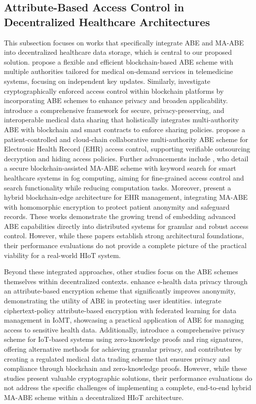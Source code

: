 \documentclass[cic,tc,english]{iiufrgs}
\numberwithin{algorithm}{chapter}
\begin{document}
        \subsection{Attribute-Based Access Control in Decentralized Healthcare Architectures}
            This subsection focuses on works that specifically integrate ABE and MA-ABE into decentralized healthcare data storage, which is central to our proposed solution. \citet{Guo2019Flexible} propose a flexible and efficient blockchain-based ABE scheme with multiple authorities tailored for medical on-demand services in telemedicine systems, focusing on independent key updates. Similarly, \citet{Ghaffaripour2019Cryptographically} investigate cryptographically enforced access control within blockchain platforms by incorporating ABE schemes to enhance privacy and broaden applicability. \citet{Jin2019Secure} introduce a comprehensive framework for secure, privacy-preserving, and interoperable medical data sharing that holistically integrates multi-authority ABE with blockchain and smart contracts to enforce sharing policies. \citet{Yang2022Blockchain} propose a patient-controlled and cloud-chain collaborative multi-authority ABE scheme for Electronic Health Record (EHR) access control, supporting verifiable outsourcing decryption and hiding access policies. Further advancements include \citet{Li2023Secure}, who detail a secure blockchain-assisted MA-ABE scheme with keyword search for smart healthcare systems in fog computing, aiming for fine-grained access control and search functionality while reducing computation tasks. Moreover, \citet{Guo2023Hybrid} present a hybrid blockchain-edge architecture for EHR management, integrating MA-ABE with homomorphic encryption to protect patient anonymity and safeguard records. These works demonstrate the growing trend of embedding advanced ABE capabilities directly into distributed systems for granular and robust access control. However, while these papers establish strong architectural foundations, their performance evaluations do not provide a complete picture of the practical viability for a real-world HIoT system.

            Beyond these integrated approaches, other studies focus on the ABE schemes themselves within decentralized contexts. \citet{Zala2024} enhance e-health data privacy through an attribute-based encryption scheme that significantly improves anonymity, demonstrating the utility of ABE in protecting user identities. \citet{Bhansali2022} integrate ciphertext-policy attribute-based encryption with federated learning for data management in IoMT, showcasing a practical application of ABE for managing access to sensitive health data. Additionally, \citet{Esfahani2024} introduce a comprehensive privacy scheme for IoT-based systems using zero-knowledge proofs and ring signatures, offering alternative methods for achieving granular privacy, and \citet{Li2024} contributes by creating a regulated medical data trading scheme that ensures privacy and compliance through blockchain and zero-knowledge proofs. However, while these studies present valuable cryptographic solutions, their performance evaluations do not address the specific challenges of implementing a complete, end-to-end hybrid MA-ABE scheme within a decentralized HIoT architecture.
\end{document}
